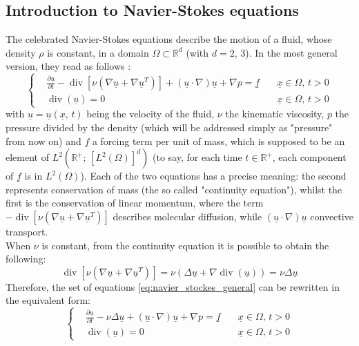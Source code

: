 \documentclass[11pt,a4paper]{article}
\newcommand{\R}{\mathds{R}}
\renewcommand{\vec}[1]{\underline{#1}} %
\DeclareMathOperator{\Div}{div}
\begin{document}
\subsection{Introduction to Navier-Stokes equations}
\label{subsec:introduction_navier_stokes}
The celebrated Navier-Stokes equations describe the motion of a fluid, whose density $\rho$ is constant, in a domain $\Omega \subset \R^{d}$ (with $d = 2, \, 3$). In the most general version, they read as follows \cite{Quarteroni2017}: 
\begin{equation}
    \label{eq:navier_stockes_general}
    \left\{
    \begin{aligned}
    &\frac{\partial \vec{u}}{\partial t} - \Div\left[ \nu \left( \nabla \vec{u} + \nabla \vec{u}^{T}\right) \right] + (\vec{u} \cdot \nabla)\vec{u} + \nabla p = \vec{f} \quad & \vec{x} \in \Omega, \, t > 0 \\
    &\Div(\vec{u}) = 0 & \vec{x} \in \Omega, \, t > 0
    \end{aligned}
    \right.
\end{equation}
with $\vec{u} = \vec{u}(\vec{x}, \, t)$ being the velocity of the fluid, $\nu$ the kinematic viscosity, $p$ the pressure divided by the density (which will be addressed simply as "pressure" from now on) and $\vec{f}$ a forcing term per unit of mass, which is supposed to be an element of $L^{2}\left(\R^{+}; \, \left[L^{2}(\Omega) \right]^{d}\right)$ (to say, for each time $t \in \R^{+}$, each component of $\vec{f}$ is in $L^{2}(\Omega)$).
Each of the two equations has a precise meaning: the second represents conservation of mass (the so called "continuity equation"), whilst the first is the conservation of linear momentum, where the term $- \Div\left[ \nu \left( \nabla \vec{u} + \nabla \vec{u}^{T}\right) \right]$ describes molecular diffusion, while $(\vec{u} \cdot \nabla)\vec{u}$ convective transport. \\
When $\nu$ is constant, from the continuity equation it is possible to obtain the following:
\begin{equation*}
    \Div\left[ \nu \left( \nabla \vec{u} + \nabla \vec{u}^{T}\right) \right] = \nu \left(\Delta \vec{u} + \nabla \Div(\vec{u}) \right) = \nu \Delta \vec{u}
\end{equation*}
Therefore, the set of equations \eqref{eq:navier_stockes_general} can be rewritten in the equivalent form: 
\begin{equation}
    \label{eq:navier_stockes_incompressible}
    \left\{
    \begin{aligned}
    &\frac{\partial \vec{u}}{\partial t} - \nu \Delta \vec{u} + (\vec{u} \cdot \nabla)\vec{u} + \nabla p = \vec{f} \quad & \vec{x} \in \Omega, \, t > 0 \\
    &\Div(\vec{u}) = 0 & \vec{x} \in \Omega, \, t > 0
    \end{aligned}
    \right.
\end{equation}
\end{document}

